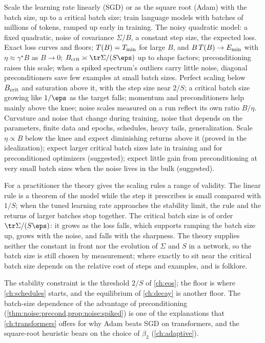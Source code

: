 \begin{refsection}
\fieldnotes
{Scale the learning rate linearly (SGD) or as the square root (Adam) with the batch size, up to a critical batch size; train language models with batches of millions of tokens, ramped up early in training.}
{The noisy quadratic model: a fixed quadratic, noise of covariance $\Sigma/B$, a constant step size, the expected loss.}
{Exact loss curves and floors; $T(B)=T_{\min}$ for large $B$, and $B\,T(B)\to E_{\min}$ with $\eta\approx\gamma^\star B$ as $B\to0$; $\noiseBcrit\asymp\tr\Sigma/(S\eps)$ up to shape factors; preconditioning raises this scale; when a spiked spectrum's outliers carry little noise, diagonal preconditioners save few examples at small batch sizes.}
{Perfect scaling below $B_{\mathrm{crit}}$ and saturation above it, with the step size near $2/S$; a critical batch size growing like $1/\eps$ as the target falls; momentum and preconditioners help mainly above the knee; noise scales measured on a run reflect its own ratio $B/\eta$.}
{Curvature and noise that change during training, noise that depends on the parameters, finite data and epochs, schedules, heavy tails, generalization.}
{Scale $\eta\propto B$ below the knee and expect diminishing returns above it (proved in the idealization); expect larger critical batch sizes late in training and for preconditioned optimizers (suggested); expect little gain from preconditioning at very small batch sizes when the noise lives in the bulk (suggested).}

For a practitioner the theory gives the scaling rules a range of validity. The linear rule is a theorem of the model while the step it prescribes is small compared with $1/S$; when the tuned learning rate approaches the stability limit, the rule and the returns of larger batches stop together. The critical batch size is of order $\tr\Sigma/(S\eps)$: it grows as the loss falls, which supports ramping the batch size up, grows with the noise, and falls with the sharpness. The theory supplies neither the constant in front nor the evolution of $\Sigma$ and $S$ in a network, so the batch size is still chosen by measurement; where exactly to sit near the critical batch size depends on the relative cost of steps and examples, and is folklore.

The stability constraint is the threshold $2/S$ of \cref{ch:eos}; the floor is where \cref{ch:schedules} starts, and the equilibrium of \cref{ch:decay} is another floor. The batch-size dependence of the advantage of preconditioning (\cref{thm:noise:precond,prop:noise:spiked}) is one of the explanations that \cref{ch:transformers} offers for why Adam beats SGD on transformers, and the square-root heuristic bears on the choice of $\beta_2$ (\cref{ch:adaptive}).


\end{refsection}
